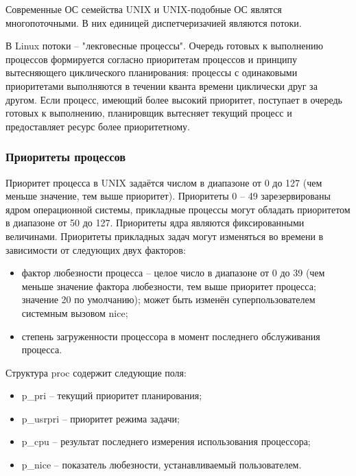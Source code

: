 Современные ОС семейства UNIX и UNIX-подобные ОС являтся многопоточными. В них единицей диспетчеризачией являются потоки.

В Linux потоки -- "лекговесные процессы". Очередь готовых к выполнению процессов формируется согласно приоритетам процессов и принципу вытесняющего циклического планирования: процессы с одинаковыми приоритетами выполняются в течении кванта времени циклически друг за другом. Если процесс, имеющий более высокий приоритет, поступает в очередь готовых к выполнению, планировщик вытесняет текущий процесс и предоставляет ресурс более приоритетному.

\subsubsection*{Приоритеты процессов}

Приоритет процесса в UNIX задаётся числом в диапазоне от 0 до 127 (чем меньше значение, тем выше приоритет). Приоритеты 0 -- 49 зарезервированы ядром операционной системы, прикладные процессы могут обладать приоритетом в диапазоне от 50 до 127. Приоритеты ядра являются фиксированными величинами.
Приоритеты прикладных задач могут изменяться во времени в зависимости от следующих двух факторов:

\begin{itemize}
	\item фактор любезности процесса -- целое число в диапазоне от 0 до 39 (чем меньше значение фактора любезности, тем выше приоритет процесса; значение 20 по умолчанию); может быть изменён суперпользователем системным вызовом nice;
	
	\item степень загруженности процессора в момент последнего обслуживания процесса.
\end{itemize}

Структура proc содержит следующие поля:

\begin{itemize}
	\item  p\_pri -- текущий приоритет планирования;
	
	\item p\_usrpri -- приоритет режима задачи;
	
	\item p\_cpu -- результат последнего измерения использования процессора;
	
	\item p\_nice -- показатель любезности, устанавливаемый пользователем.
\end{itemize}

